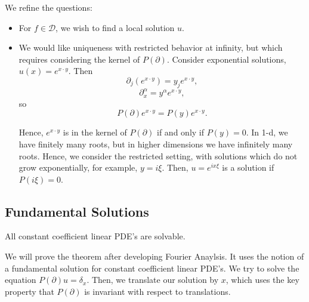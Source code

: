 \documentclass[11pt]{scrartcl}
\begin{document}
We refine the questions:
\begin{itemize}
\item For $f \in \mathcal D$, we wish to find a local solution $u$.  
\item We would like uniqueness with restricted behavior at infinity, but which requires considering the kernel of $P(\partial)$.  Consider exponential solutions, $u(x) = e^{x\cdot y}$.  Then $$\partial_j(e^{x\cdot y}) = y_je^{x \cdot y}, $$ $$\partial_x^{\alpha} = y^{\alpha}e^{x \cdot y},$$
so $$P(\partial)e^{x \cdot y} = P(y)e^{x \cdot y}.$$

Hence, $e^{x \cdot y}$ is in the kernel of $P(\partial)$ if and only if $P(y) = 0.$  In 1-d, we have finitely many roots, but in higher dimensions we have infinitely many roots.  Hence, we consider the restricted setting, with solutions which do not grow exponentially, for example, $y = i\xi$.  Then, $u = e^{ix\xi}$ is a solution if $P(i \xi) = 0$.

\end{itemize}
\subsection{Fundamental Solutions}
\begin{thm} All constant coefficient linear PDE's are solvable.
\end{thm}
We will prove the theorem after developing Fourier Anaylsis.  It uses the notion of a fundamental solution for constant coefficient linear PDE's.  We try to solve the equation $P(\partial)u = \delta_x$.  Then, we translate our solution by $x$, which uses the key property that $P(\partial)$ is invariant with respect to translations.
\end{document}
